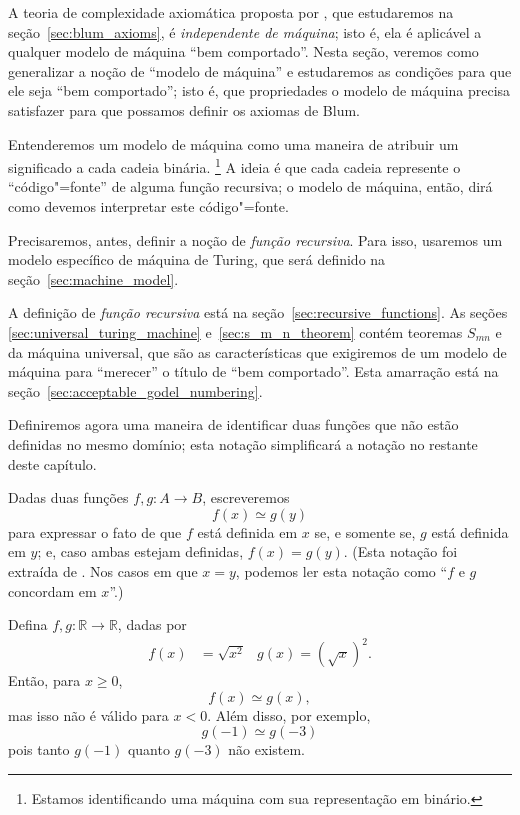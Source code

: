A teoria de complexidade axiomática proposta por ,
que estudaremos na seção~\ref{sec:blum_axioms},
é \emph{independente de máquina};
isto é,
ela é aplicável a qualquer modelo de máquina ``bem comportado''.
Nesta seção,
veremos como generalizar a noção de ``modelo de máquina''
e estudaremos as condições para que ele seja ``bem comportado'';
isto é,
que propriedades o modelo de máquina precisa satisfazer
para que possamos definir os axiomas de Blum.

Entenderemos um modelo de máquina como
uma maneira de atribuir um significado a cada cadeia binária.%
\footnote{
    Estamos identificando uma máquina com sua representação em binário.
}
A ideia é que cada cadeia represente o ``código"=fonte''
de alguma função recursiva;
o modelo de máquina, então,
dirá como devemos interpretar este código"=fonte.

Precisaremos, antes,
definir a noção de \emph{função recursiva}.
Para isso,
usaremos um modelo específico de máquina de Turing,
que será definido na seção~\ref{sec:machine_model}.

A definição de \emph{função recursiva} está na seção~\ref{sec:recursive_functions}.
As seções \ref{sec:universal_turing_machine} e~\ref{sec:s_m_n_theorem}
contém teoremas $S_{mn}$ e da máquina universal,
que são as características que exigiremos de um modelo de máquina
para ``merecer'' o título de ``bem comportado''.
Esta amarração está na seção~\ref{sec:acceptable_godel_numbering}.

Definiremos agora uma maneira de identificar duas funções
que não estão definidas no mesmo domínio;
esta notação simplificará a notação no restante deste capítulo.

\begin{notation}
    Dadas duas funções $f, g: A \to B$,
    escreveremos
    \begin{equation*}
        f(x) \simeq g(y)
    \end{equation*}
    para expressar o fato de que
    $f$ está definida em $x$ se, e somente se, $g$ está definida em $y$;
    e, caso ambas estejam definidas,
    $f(x) = g(y)$.
    (Esta notação foi extraída de .
    Nos casos em que $x = y$,
    podemos ler esta notação como ``$f$ e $g$ concordam em $x$''.)
\end{notation}

\begin{example}
    Defina $f, g: \mathbb R \to \mathbb R$, dadas por
    \begin{align*}
        f(x) &= \sqrt{x^2} & g(x) = {(\sqrt x)}^2.
    \end{align*}
    Então, para $x \geq 0$,
    \begin{equation*}
        f(x) \simeq g(x),
    \end{equation*}
    mas isso não é válido para $x < 0$.
    Além disso, por exemplo,
    \begin{equation*}
        g(-1) \simeq g(-3)
    \end{equation*}
    pois tanto $g(-1)$ quanto $g(-3)$ não existem.
\end{example}
